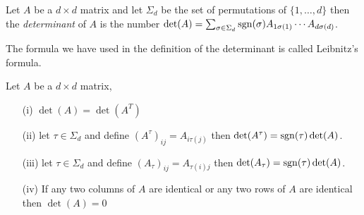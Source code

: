 \begin{defn}Let $A$ be a $d \times d$ matrix and let $\Sigma_d$ be the set of permutations of $\lbrace 1, \dotsc, d \rbrace$ then the \emph{determinant} of $A$ is the number $\det(A) = \sum_{\sigma \in \Sigma_d} \operatorname*{sgn}(\sigma) A_{1\sigma(1)} \dotsb A_{d \sigma(d)}$.
\end{defn}
The formula we have used in the definition of the determinant is called Leibnitz's formula.

\begin{prop}\label{DeterminantUnderPermutationTranspose}Let $A$ be a $d \times d$ matrix, 
\begin{itemize}
\item[(i)] $\det(A) = \det(A^T)$
\item[(ii)] let $\tau \in \Sigma_d$ and define $(A^\tau)_{ij} = A_{i \tau(j)}$ then $\det(A^\tau) = \operatorname*{sgn}(\tau) \det(A)$. 
\item[(iii)] let $\tau \in \Sigma_d$ and define $(A_\tau)_{ij} = A_{\tau(i) j}$ then $\det(A_\tau) = \operatorname*{sgn}(\tau) \det(A)$. 
\item[(iv)] If any two columns of $A$ are identical or any two rows of $A$ are identical then $\det(A) = 0$
\end{itemize}
\end{prop}
